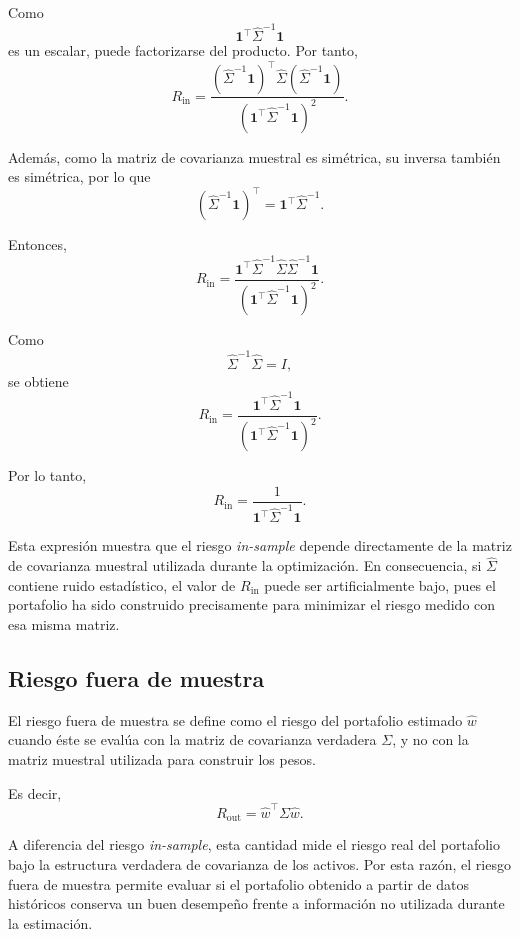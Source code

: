\documentclass[letterpaper,12pt,oneside]{book}
\begin{document}
Como
\[
\mathbf{1}^\top
\widehat{\Sigma}^{-1}
\mathbf{1}
\]
es un escalar, puede factorizarse del producto. Por tanto,
\[
R_{\mathrm{in}}
=
\frac{
(\widehat{\Sigma}^{-1}\mathbf{1})^\top
\widehat{\Sigma}
(\widehat{\Sigma}^{-1}\mathbf{1})
}{
\left(
\mathbf{1}^\top
\widehat{\Sigma}^{-1}
\mathbf{1}
\right)^2
}.
\]

Además, como la matriz de covarianza muestral es simétrica, su inversa también es simétrica, por lo que
\[
(\widehat{\Sigma}^{-1}\mathbf{1})^\top
=
\mathbf{1}^\top
\widehat{\Sigma}^{-1}.
\]

Entonces,
\[
R_{\mathrm{in}}
=
\frac{
\mathbf{1}^\top
\widehat{\Sigma}^{-1}
\widehat{\Sigma}
\widehat{\Sigma}^{-1}
\mathbf{1}
}{
\left(
\mathbf{1}^\top
\widehat{\Sigma}^{-1}
\mathbf{1}
\right)^2
}.
\]

Como
\[
\widehat{\Sigma}^{-1}\widehat{\Sigma}=I,
\]
se obtiene
\[
R_{\mathrm{in}}
=
\frac{
\mathbf{1}^\top
\widehat{\Sigma}^{-1}
\mathbf{1}
}{
\left(
\mathbf{1}^\top
\widehat{\Sigma}^{-1}
\mathbf{1}
\right)^2
}.
\]

Por lo tanto,
\[
R_{\mathrm{in}}
=
\frac{
1
}{
\mathbf{1}^\top
\widehat{\Sigma}^{-1}
\mathbf{1}
}.
\]

Esta expresión muestra que el riesgo \textit{in-sample} depende directamente de la matriz de covarianza muestral utilizada durante la optimización. En consecuencia, si \(\widehat{\Sigma}\) contiene ruido estadístico, el valor de \(R_{\mathrm{in}}\) puede ser artificialmente bajo, pues el portafolio ha sido construido precisamente para minimizar el riesgo medido con esa misma matriz.

\subsection{Riesgo fuera de muestra}

El riesgo fuera de muestra se define como el riesgo del portafolio estimado \(\widehat{w}\) cuando éste se evalúa con la matriz de covarianza verdadera \(\Sigma\), y no con la matriz muestral utilizada para construir los pesos.

Es decir,
\[
R_{\mathrm{out}}
=
\widehat{w}^\top
\Sigma
\widehat{w}.
\]

A diferencia del riesgo \textit{in-sample}, esta cantidad mide el riesgo real del portafolio bajo la estructura verdadera de covarianza de los activos. Por esta razón, el riesgo fuera de muestra permite evaluar si el portafolio obtenido a partir de datos históricos conserva un buen desempeño frente a información no utilizada durante la estimación.
\end{document}
